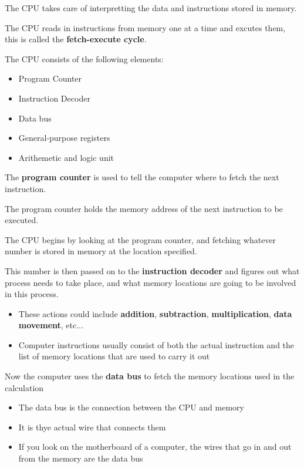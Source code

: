 \documentclass{article}
\begin{document}
	The CPU takes care of interpretting the data and instructions stored in memory.
	
	The CPU reads in instructions from memory one at a time and excutes them,
	this is called the \textbf {fetch-execute cycle}.
	
	The CPU consists of the following elements:
	\begin {itemize}
		\item Program Counter
		\item Instruction Decoder
		\item Data bus
		\item General-purpose registers
		\item Arithemetic and logic unit
	\end {itemize}
	
	The \textbf {program counter} is used to tell the computer where to fetch the next
	instruction.
	
	The program counter holds the memory address of the next instruction to be executed.
	
	The CPU begins by looking at the program counter, and fetching whatever number is
	stored in memory at the location specified.
	
	This number is then passed on to the \textbf {instruction decoder} and figures out
	what process needs to take place, and what memory locations are going to be involved in
	this process.
	\begin {itemize}
		\item These actions could include \textbf {addition}, \textbf {subtraction},
			\textbf {multiplication}, \textbf {data movement}, etc...
		\item Computer instructions usually consist of both the actual instruction
			and the list of memory locations that are used to carry it out
	\end {itemize}
	
	Now the computer uses the \textbf {data bus} to fetch the memory locations used
	in the calculation
	\begin {itemize}
		\item The data bus is the connection between the CPU and memory
		\item It is thye actual wire that connects them
		\item If you look on the motherboard of a computer, the wires that
			go in and out from the memory are the data bus
	\end {itemize}
	
\end{document}

